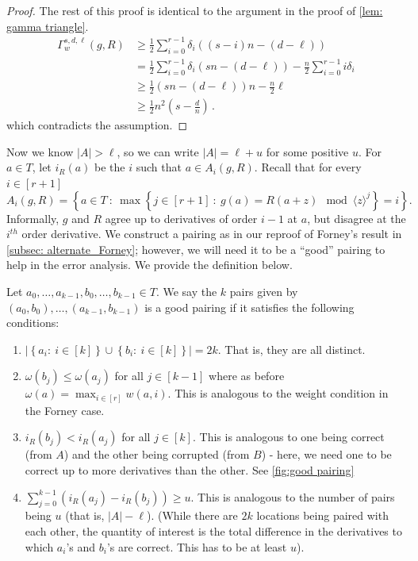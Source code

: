 \documentclass{theoretics}
\def\set#1{\left\{ #1 \right\}}
\def\abs#1{\left| #1 \right|}
\def\inbrace#1{\left\{ #1 \right\}}
\def\setdef#1#2{\inbrace{ #1 \ \colon \ #2}}      %
\begin{document}
\begin{proof}
		The rest of this proof is identical to the argument in the proof of \cref{lem: gamma triangle}. 
		\[  
		\begin{split}
			\Gamma_w^{s,d,\ell}(g, R) & \geq \frac{1}{2} \sum_{i=0}^{r-1} \delta_i ((s-i)n - (d-\ell))  \\
			& = \frac{1}{2} \sum_{i=0}^{r-1} \delta_i (sn - (d-\ell)) -\frac{n}{2} \sum_{i=0}^{r-1} i \delta_i   \\
			& \geq \frac{1}{2} (sn-(d-\ell))n -  \frac{n}{2}\ell \\
			& \geq \frac{1}{2} n^2  \left(s- \frac{d}{n} \right) \, .
		\end{split}
		\]
		which contradicts the assumption.
	\end{proof}
	
	Now we know $\abs{A} > \ell$, so we can write $\abs{A} = \ell+u$ for some positive $u$.
	For $a \in T$, let $i_R(a)$ be the $i$ such that $a \in A_i(g, R)$. Recall that for every $i \in [r+1]$
	\[
	A_i(g,R)=\setdef{a\in T}{\max{\setdef{j\in [r+1]}{g(a)=R(a+z) \mod \langle z\rangle^{j}}}=i}.
	\]
	Informally, $g$ and $R$ agree up to derivatives of order $i-1$ at $a$, but disagree at the $i^{th}$ order derivative.
	We construct a pairing as in our reproof of Forney's result in \cref{subsec: alternate_Forney}; however,  we will need it to be a ``good'' pairing to help in the error analysis. We provide the definition below.
	
	\begin{definition} \label{def: good pairing}
		Let $a_0, \dotsc, a_{k-1}, b_0, \dotsc, b_{k-1} \in T$. We say the $k$ pairs given by $(a_0,
		b_0), \dotsc, (a_{k-1}, b_{k-1})$ is a good pairing if it satisfies
		the following conditions: 
		
		
		\begin{enumerate}
			\item $\abs{\set{a_i\colon \ i \in [k]}\cup \set{b_i\colon \ i \in [k]}} = 2k$. That is, they are all distinct. 
			\item $\omega(b_j) \leq \omega(a_j)$ for all $j \in [k-1]$  where as before  $ \omega(a) = \max_{i \in [r]} w(a, i)$.
			This is analogous to the weight condition in the Forney case.
			\item $i_R(b_j) < i_R(a_j)$ for all $j \in [k]$. This is analogous to one being correct (from $A$) and the other being corrupted (from $B$) - here, we need one to be correct up to more derivatives than the other. See \cref{fig:good pairing}
			\item $\sum_{j=0}^{k-1} (i_R(a_j) - i_R(b_j)) \geq u$. This is
			analogous to the number of pairs being $u$ (that is,  $\abs{A} -
			\ell$). (While there are $2k$ locations being paired with each
			other, the quantity of interest is the total difference in the
			derivatives to which $a_i$'s and $b_i$'s are correct. This has
			to be at least $u$). \qedhere
		\end{enumerate}
	\end{definition}
	
\end{document}
